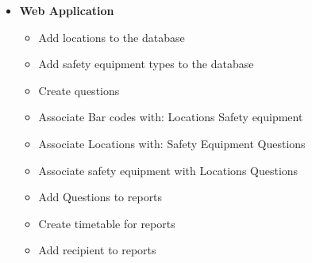 \documentclass[Letter,11pt]{article}
\begin{document}
	\begin{minipage}[t]{0.5\textwidth}
		\begin{itemize}
			\item \textbf{Web Application}
				\begin{itemize}
					\item Add locations to the database
					\item Add safety equipment types to the database
					\item Create questions
					\item Associate Bar codes with:
						\subitem Locations
						\subitem Safety equipment
					\item Associate Locations with:
						\subitem Safety Equipment
						\subitem Questions
					\item Associate safety equipment with
						\subitem Locations
						\subitem Questions
					\item Add Questions to reports
					\item Create timetable for reports
					\item Add recipient to reports
				\end{itemize}
		\end{itemize}
	\end{minipage}
		
\end{document}
